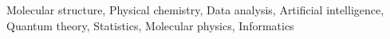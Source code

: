 \documentclass[]{article}
\begin{document}
Molecular structure, Physical chemistry, Data analysis, Artificial intelligence, Quantum theory, Statistics, Molecular physics, Informatics
\end{document}
